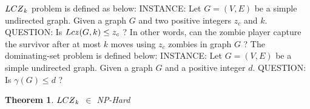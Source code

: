 \documentclass[1p]{elsarticle}
\newtheorem{theorem}{Theorem}
\newcommand{\NPZ}{\ooalign{$Z$\cr\hfil\rule[.8ex]{.3em}{.09ex}\hfil\cr}}
\newcommand{\zn}{\ooalign{$z$\cr\hfil\rule[.5ex]{.2em}{.08ex}\hfil\cr}}
\begin{document}
	$LC\NPZ_k$ problem is defined as below:
	{\newline}
	INSTANCE: Let $G = (V,E)$ be a simple undirected graph. Given a graph $G$ and two positive integers $z_c$ and $k$.
	{\newline}
	QUESTION: Is $Lc\zn(G,k) \leq z_c$ ? In other words, can the zombie player capture the survivor after at most $k$ moves using 
	$z_c$ zombies in graph $G$ ?
	{\newline}
	{\newline}
	The dominating-set problem is defined below:
	{\newline}
	INSTANCE: Let $G = (V,E)$ be a simple undirected graph. Given a graph $G$ and a positive integer $d$.
	{\newline}
	QUESTION: Is $\gamma(G) \leq d$ ?

	\begin{theorem}
		$LC\NPZ_k$ $\in$ NP-Hard
	\end{theorem}
\end{document}

